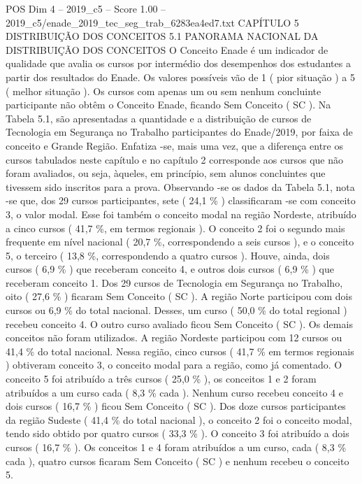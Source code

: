 \begin{textsample}{POS Dim 4 – 2019\_c5 – Score 1.00 – 2019\_c5/enade\_2019\_tec\_seg\_trab\_6283ea4ed7.txt}  \label{ex:f4_pos_198}
CAPÍTULO 5 DISTRIBUIÇÃO DOS CONCEITOS 5.1 PANORAMA NACIONAL DA DISTRIBUIÇÃO DOS CONCEITOS O Conceito Enade é um indicador de qualidade que avalia os cursos por intermédio dos desempenhos dos estudantes a partir dos resultados do Enade.
Os valores possíveis vão de 1 ( pior situação ) a 5 ( melhor situação ).
Os cursos com apenas um ou sem nenhum concluinte participante não obtêm o Conceito Enade, ficando Sem Conceito ( SC ).
Na Tabela 5.1, são apresentadas a quantidade e a distribuição de cursos de Tecnologia em Segurança no Trabalho participantes do Enade/2019, por faixa de conceito e Grande Região.
Enfatiza -se, mais uma vez, que a diferença entre os cursos tabulados neste capítulo e no capítulo 2 corresponde aos cursos que não foram avaliados, ou seja, àqueles, em princípio, sem alunos concluintes que tivessem sido inscritos para a prova.
Observando -se os dados da Tabela 5.1, nota -se que, dos 29 cursos participantes, sete ( 24,1 \% ) classificaram -se com conceito 3, o valor modal.
Esse foi também o conceito modal na região Nordeste, atribuído a cinco cursos ( 41,7 \%, em termos regionais ).
O conceito 2 foi o segundo mais frequente em nível nacional ( 20,7 \%, correspondendo a seis cursos ), e o conceito 5, o terceiro ( 13,8 \%, correspondendo a quatro cursos ).
Houve, ainda, dois cursos ( 6,9 \% ) que receberam conceito 4, e outros dois cursos ( 6,9 \% ) que receberam conceito 1.
Dos 29 cursos de Tecnologia em Segurança no Trabalho, oito ( 27,6 \% ) ficaram Sem Conceito ( SC ).
A região Norte participou com dois cursos ou 6,9 \% do total nacional.
Desses, um curso ( 50,0 \% do total regional ) recebeu conceito 4.
O outro curso avaliado ficou Sem Conceito ( SC ).
Os demais conceitos não foram utilizados.
A região Nordeste participou com 12 cursos ou 41,4 \% do total nacional.
Nessa região, cinco cursos ( 41,7 \% em termos regionais ) obtiveram conceito 3, o conceito modal para a região, como já comentado.
O conceito 5 foi atribuído a três cursos ( 25,0 \% ), os conceitos 1 e 2 foram atribuídos a um curso cada ( 8,3 \% cada ).
Nenhum curso recebeu conceito 4 e dois cursos ( 16,7 \% ) ficou Sem Conceito ( SC ).
Dos doze cursos participantes da região Sudeste ( 41,4 \% do total nacional ), o conceito 2 foi o conceito modal, tendo sido obtido por quatro cursos ( 33,3 \% ).
O conceito 3 foi atribuído a dois cursos ( 16,7 \% ).
Os conceitos 1 e 4 foram atribuídos a um curso, cada ( 8,3 \% cada ), quatro cursos ficaram Sem Conceito ( SC ) e nenhum recebeu o conceito 5.

\end{textsample}
